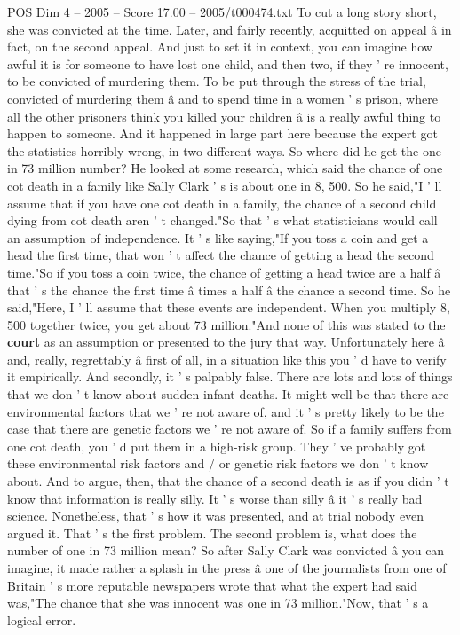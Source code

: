 \begin{textsample}{POS Dim 4 – 2005 – Score 17.00 – 2005/t000474.txt}
To cut a long story short, she was convicted at the time.
Later, and fairly recently, acquitted on appeal â in fact, on the second appeal.
And just to set it in context, you can imagine how awful it is for someone to have lost one child, and then two, if they ' re innocent, to be convicted of murdering them.
To be put through the stress of the trial, convicted of murdering them â and to spend time in a women ' s prison, where all the other prisoners think you killed your children â is a really awful thing to happen to someone.
And it happened in large part here because the expert got the statistics horribly wrong, in two different ways.
So where did he get the one in 73 million number?
He looked at some research, which said the chance of one cot death in a family like Sally Clark ' s is about one in 8, 500.
So he said,"I ' ll assume that if you have one cot death in a family, the chance of a second child dying from cot death aren ' t changed."So that ' s what statisticians would call an assumption of independence.
It ' s like saying,"If you toss a coin and get a head the first time, that won ' t affect the chance of getting a head the second time."So if you toss a coin twice, the chance of getting a head twice are a half â that ' s the chance the first time â times a half â the chance a second time.
So he said,"Here, I ' ll assume that these events are independent.
When you multiply 8, 500 together twice, you get about 73 million."And none of this was stated to the \textbf{court} as an assumption or presented to the jury that way.
Unfortunately here â and, really, regrettably â first of all, in a situation like this you ' d have to verify it empirically.
And secondly, it ' s palpably false.
There are lots and lots of things that we don ' t know about sudden infant deaths.
It might well be that there are environmental factors that we ' re not aware of, and it ' s pretty likely to be the case that there are genetic factors we ' re not aware of.
So if a family suffers from one cot death, you ' d put them in a high-risk group.
They ' ve probably got these environmental risk factors and / or genetic risk factors we don ' t know about.
And to argue, then, that the chance of a second death is as if you didn ' t know that information is really silly.
It ' s worse than silly â it ' s really bad science.
Nonetheless, that ' s how it was presented, and at trial nobody even argued it.
That ' s the first problem.
The second problem is, what does the number of one in 73 million mean?
So after Sally Clark was convicted â you can imagine, it made rather a splash in the press â one of the journalists from one of Britain ' s more reputable newspapers wrote that what the expert had said was,"The chance that she was innocent was one in 73 million."Now, that ' s a logical error.

\end{textsample}
